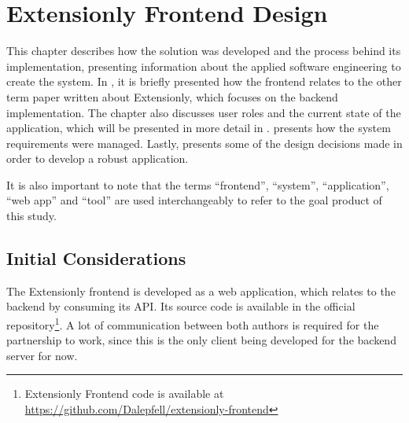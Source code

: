 \chapter{Extensionly Frontend Design}\label{extensionly}

This chapter describes how the solution was developed and the process behind its implementation, presenting information about the applied software engineering to create the system. In , it is briefly presented how the frontend relates to the other term paper written about Extensionly, which focuses on the backend implementation. The chapter also discusses user roles and the current state of the application, which will be presented in more detail in .  presents how the system requirements were managed. Lastly,  presents some of the design decisions made in order to develop a robust application.

It is also important to note that the terms ``frontend'', ``system'', ``application'', ``web app'' and ``tool'' are used interchangeably to refer to the goal product of this study.

\section{Initial Considerations}\label{ext:initial-considerations}

The Extensionly frontend is developed as a web application, which relates to the backend by consuming its \ac{API}. Its source code is available in the official repository\footnote{Extensionly Frontend code is available at \url{https://github.com/Dalepfell/extensionly-frontend}}. A lot of communication between both authors is required for the partnership to work, since this is the only client being developed for the backend server for now.

